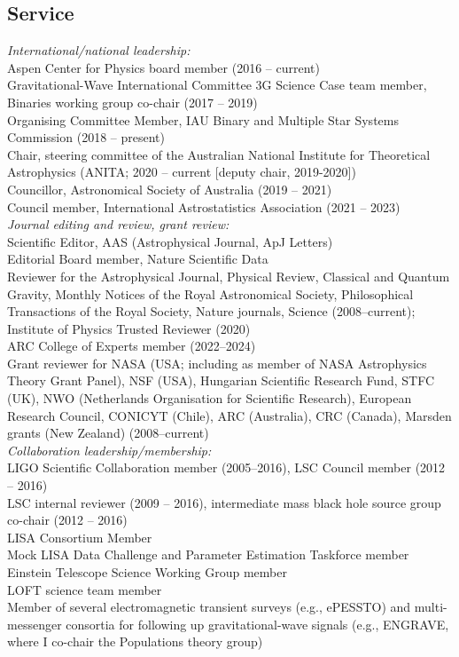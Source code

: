 \documentclass[margin,line]{res}
\begin{document}
\begin{resume}
\section{\sc Service}

{\it International/national leadership:}\\
Aspen Center for Physics board member (2016 -- current)\\
Gravitational-Wave International Committee 3G Science Case team member, Binaries working group co-chair (2017 -- 2019)\\
Organising Committee Member, IAU Binary and Multiple Star Systems Commission (2018 -- present)\\
Chair, steering committee of the Australian National Institute for Theoretical Astrophysics (ANITA; 2020 -- current [deputy chair, 2019-2020])\\
Councillor, Astronomical Society of Australia (2019 -- 2021)\\
Council member, International Astrostatistics Association (2021 -- 2023)\\

{\it Journal editing and review, grant review:}\\
Scientific Editor, AAS (Astrophysical Journal, ApJ Letters)\\
Editorial Board member, Nature Scientific Data\\
Reviewer for the Astrophysical Journal, Physical Review, Classical and Quantum Gravity, Monthly Notices of the Royal Astronomical Society, Philosophical Transactions of the Royal Society, Nature journals, Science (2008--current); Institute of Physics Trusted Reviewer (2020) \\
ARC College of Experts member (2022--2024)\\
Grant reviewer for NASA (USA; including as member of NASA Astrophysics Theory Grant Panel), NSF (USA), Hungarian Scientific Research Fund, STFC (UK), NWO (Netherlands Organisation for Scientific Research), European Research Council, CONICYT (Chile), ARC (Australia), CRC (Canada), Marsden grants (New Zealand) (2008--current)\\

{\it Collaboration leadership/membership:}\\
LIGO Scientific Collaboration member (2005--2016), LSC Council member (2012 -- 2016)\\
LSC internal reviewer (2009 -- 2016), intermediate mass black hole source group co-chair (2012 -- 2016)\\
LISA Consortium Member\\
Mock LISA Data Challenge and Parameter Estimation Taskforce member\\
Einstein Telescope Science Working Group member\\
LOFT science team member\\
Member of several electromagnetic transient surveys (e.g., ePESSTO) and multi-messenger  consortia for following up gravitational-wave signals (e.g., ENGRAVE, where I co-chair the Populations theory group)\\


\end{resume}
\end{document}
